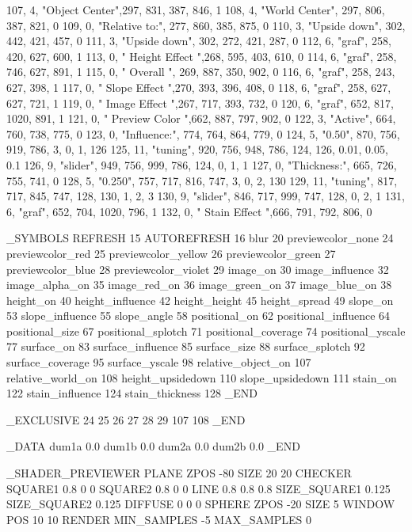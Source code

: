    107,	4,	"Object Center",297, 831, 387, 846, 1
   108,	4,	"World Center",	297, 806, 387, 821, 0
   109,	0,	"Relative to:",	277, 860, 385, 875, 0
   110,	3,	"Upside down",	302, 442, 421, 457, 0
   111,	3,	"Upside down",	302, 272, 421, 287, 0
   112,	6,	"graf",		258, 420, 627, 600, 1
   113,	0,	" Height Effect ",268, 595, 403, 610, 0
   114,	6,	"graf",		258, 746, 627, 891, 1
   115,	0,	" Overall ",	269, 887, 350, 902, 0
   116,	6,	"graf",		258, 243, 627, 398, 1
   117,	0,	" Slope Effect ",270, 393, 396, 408, 0
   118,	6,	"graf",		258, 627, 627, 721, 1
   119,	0,	" Image Effect ",267, 717, 393, 732, 0
   120,	6,	"graf",		652, 817, 1020, 891, 1
   121,	0,	" Preview Color ",662, 887, 797, 902, 0
   122,	3,	"Active",	664, 760, 738, 775, 0
   123,	0,	"Influence:",	774, 764, 864, 779, 0
   124,	5,	"0.50",		870, 756, 919, 786, 3, 0, 1, 126
   125,	11,	"tuning",	920, 756, 948, 786, 124, 126, 0.01, 0.05, 0.1
   126,	9,	"slider",	949, 756, 999, 786, 124, 0, 1, 1
   127,	0,	"Thickness:",	665, 726, 755, 741, 0
   128,	5,	"0.250",	757, 717, 816, 747, 3, 0, 2, 130
   129,	11,	"tuning",	817, 717, 845, 747, 128, 130, 1, 2, 3
   130,	9,	"slider",	846, 717, 999, 747, 128, 0, 2, 1
   131,	6,	"graf",		652, 704, 1020, 796, 1
   132,	0,	" Stain Effect ",666, 791, 792, 806, 0

_SYMBOLS
  REFRESH    15
  AUTOREFRESH    16
  blur    20
  previewcolor_none    24
  previewcolor_red    25
  previewcolor_yellow    26
  previewcolor_green    27
  previewcolor_blue    28
  previewcolor_violet    29
  image_on    30
  image_influence    32
  image_alpha_on    35
  image_red_on    36
  image_green_on    37
  image_blue_on    38
  height_on    40
  height_influence    42
  height_height    45
  height_spread    49
  slope_on    53
  slope_influence    55
  slope_angle    58
  positional_on    62
  positional_influence    64
  positional_size    67
  positional_splotch    71
  positional_coverage    74
  positional_yscale    77
  surface_on    83
  surface_influence    85
  surface_size    88
  surface_splotch    92
  surface_coverage    95
  surface_yscale    98
  relative_object_on    107
  relative_world_on    108
  height_upsidedown    110
  slope_upsidedown    111
  stain_on    122
  stain_influence    124
  stain_thickness    128
_END

_EXCLUSIVE
24 25 26 27 28 29
107 108
_END



_DATA
dum1a 0.0
dum1b 0.0
dum2a 0.0
dum2b 0.0
_END


_SHADER_PREVIEWER
PLANE
  ZPOS -80
  SIZE 20 20
  CHECKER
    SQUARE1 0.8 0 0
    SQUARE2 0.8 0 0
    LINE 0.8 0.8 0.8
    SIZE_SQUARE1 0.125
    SIZE_SQUARE2 0.125
    DIFFUSE 0 0 0
SPHERE
  ZPOS -20
  SIZE 5
WINDOW
  POS 10 10
RENDER
  MIN_SAMPLES -5
  MAX_SAMPLES 0

